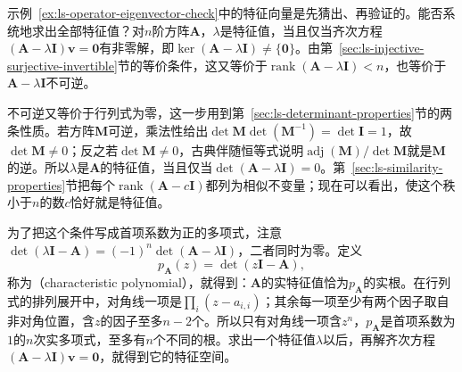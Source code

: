 示例~\ref{ex:ls-operator-eigenvector-check}中的特征向量是先猜出、再验证的。能否系统地求出全部特征值？对$n$阶方阵$\bm A$，$\lambda$是特征值，当且仅当齐次方程$(\bm A-\lambda\bm I)\bm v=\bm0$有非零解，即$\ker(\bm A-\lambda\bm I)\neq\{\bm0\}$。由第~\ref{sec:ls-injective-surjective-invertible}节的等价条件，这又等价于$\operatorname{rank}(\bm A-\lambda\bm I)<n$，也等价于$\bm A-\lambda\bm I$不可逆。

不可逆又等价于行列式为零，这一步用到第~\ref{sec:ls-determinant-properties}节的两条性质。若方阵$\bm M$可逆，乘法性给出$\det\bm M\det(\bm M^{-1})=\det\bm I=1$，故$\det\bm M\neq0$；反之若$\det\bm M\neq0$，古典伴随恒等式说明$\operatorname{adj}(\bm M)/\det\bm M$就是$\bm M$的逆。所以$\lambda$是$\bm A$的特征值，当且仅当$\det(\bm A-\lambda\bm I)=0$。第~\ref{sec:ls-similarity-properties}节把每个$\operatorname{rank}(\bm A-c\bm I)$都列为相似不变量；现在可以看出，使这个秩小于$n$的数$c$恰好就是特征值。

为了把这个条件写成首项系数为正的多项式，注意$\det(\lambda\bm I-\bm A)=(-1)^n\det(\bm A-\lambda\bm I)$，二者同时为零。定义
\begin{equation}
 p_{\bm A}(z)=\det(z\bm I-\bm A),
 \label{eq:matrix-analysis-characteristic-polynomial}
\end{equation}
称为（characteristic polynomial），就得到：$\bm A$的实特征值恰为$p_{\bm A}$的实根。在行列式的排列展开中，对角线一项是$\prod_i(z-a_{i,i})$；其余每一项至少有两个因子取自非对角位置，含$z$的因子至多$n-2$个。所以只有对角线一项含$z^n$，$p_{\bm A}$是首项系数为$1$的$n$次实多项式，至多有$n$个不同的根。求出一个特征值$\lambda$以后，再解齐次方程$(\bm A-\lambda\bm I)\bm v=\bm0$，就得到它的特征空间。

